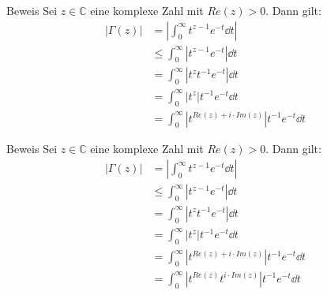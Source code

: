 \documentclass[10pt]{beamer}
\def\bC{\mathbb{C}}
\begin{document}
\begin{frame}{Beweis}
    Sei \( z \in \bC \) eine komplexe Zahl mit \( Re(z) > 0 \). Dann gilt:
    \begin{align*}
        \left\vert \Gamma( z ) \right\vert
        & = \left\vert \int_{0}^{\infty} t^{z - 1} e^{-t} \dd{t} \right\vert \\
        & \leq \int_{0}^{\infty} \left\vert t^{z - 1} e^{-t} \right\vert \dd{t} \\
        & = \int_{0}^{\infty} \left\vert t^{z}t^{-1} e^{-t} \right\vert \dd{t} \\
        & = \int_{0}^{\infty} \left\vert t^{z} \right\vert t^{-1} e^{-t} \dd{t} \\
        & = \int_{0}^{\infty} \left\vert t^{Re(z) + i \cdot Im(z)} \right\vert t^{-1} e^{-t} \dd{t}
    \end{align*}
\end{frame}



\begin{frame}{Beweis}
    Sei \( z \in \bC \) eine komplexe Zahl mit \( Re(z) > 0 \). Dann gilt:
    \begin{align*}
        \left\vert \Gamma( z ) \right\vert
        & = \left\vert \int_{0}^{\infty} t^{z - 1} e^{-t} \dd{t} \right\vert \\
        & \leq \int_{0}^{\infty} \left\vert t^{z - 1} e^{-t} \right\vert \dd{t} \\
        & = \int_{0}^{\infty} \left\vert t^{z}t^{-1} e^{-t} \right\vert \dd{t} \\
        & = \int_{0}^{\infty} \left\vert t^{z} \right\vert t^{-1} e^{-t} \dd{t} \\
        & = \int_{0}^{\infty} \left\vert t^{Re(z) + i \cdot Im(z)} \right\vert t^{-1} e^{-t} \dd{t} \\
        & = \int_{0}^{\infty} \left\vert t^{Re(z)} t^{i \cdot Im(z)} \right\vert t^{-1} e^{-t} \dd{t}
    \end{align*}
\end{frame}
\end{document}

